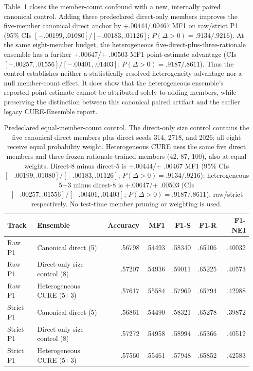 \documentclass[11pt]{article}
\begin{document}
Table~\ref{tab:direct8-control} closes the member-count confound with a new, internally paired canonical control. Adding three predeclared direct-only members improves the five-member canonical direct anchor by +.00444/.00467 MF1 on raw/strict P1 (95\% CIs $[-.00199,.01080]/[-.00183,.01126]$; $P(\Delta>0)=.9134/.9216$). At the same eight-member budget, the heterogeneous five-direct-plus-three-rationale ensemble has a further +.00647/+ .00503 MF1 point-estimate advantage (CIs $[-.00257,.01556]/[-.00401,.01403]$; $P(\Delta>0)=.9187/.8611$). Thus the control establishes neither a statistically resolved heterogeneity advantage nor a null member-count effect. It does show that the heterogeneous ensemble's reported point estimate cannot be attributed solely to adding members, while preserving the distinction between this canonical paired artifact and the earlier legacy CURE-Ensemble report.

\begin{table}[t]
\centering\small
\renewcommand{\arraystretch}{1.08}
\begin{tabular}{@{}llrrrrr@{}}
\toprule
Track & Ensemble & Accuracy & MF1 & F1-S & F1-R & F1-NEI\\
\midrule
Raw P1 & Canonical direct (5) & .56798 & .54493 & .58340 & .65106 & .40032\\
Raw P1 & Direct-only size control (8) & .57207 & .54936 & .59011 & .65225 & .40573\\
Raw P1 & Heterogeneous CURE (5+3) & .57617 & .55584 & .57969 & .65794 & .42988\\
\addlinespace
Strict P1 & Canonical direct (5) & .56861 & .54490 & .58321 & .65278 & .39872\\
Strict P1 & Direct-only size control (8) & .57272 & .54958 & .58994 & .65366 & .40512\\
Strict P1 & Heterogeneous CURE (5+3) & .57560 & .55461 & .57948 & .65852 & .42583\\
\bottomrule
\end{tabular}
\caption{Predeclared equal-member-count control. The direct-only size control contains the five canonical direct members plus direct seeds 314, 2718, and 2026; all eight receive equal probability weight. Heterogeneous CURE uses the same five direct members and three frozen rationale-trained members (42, 87, 100), also at equal weights. Direct-8 minus direct-5 is +.00444/+ .00467 MF1 (95\% CIs $[-.00199,.01080]/[-.00183,.01126]$; $P(\Delta>0)=.9134/.9216$); heterogeneous 5+3 minus direct-8 is +.00647/+ .00503 (CIs $[-.00257,.01556]/[-.00401,.01403]$; $P(\Delta>0)=.9187/.8611$), raw/strict respectively. No test-time member pruning or weighting is used.}\label{tab:direct8-control}
\end{table}
\end{document}
